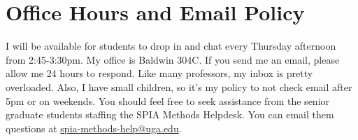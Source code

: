 \documentclass[11pt, letterpaper]{article}
\begin{document}
\section*{Office Hours and Email Policy}
I will be available for students to drop in and chat every Thursday afternoon from 2:45-3:30pm. My office is Baldwin 304C. If you send me an email, please allow me 24 hours to respond. Like many professors, my inbox is pretty overloaded. Also, I have small children, so it's my policy to not check email after 5pm or on weekends. You should feel free to seek assistance from the senior graduate students staffing the SPIA Methods Helpdesk. You can email them questions at \href{mailto:spia-methods-help@uga.edu}{spia-methods-help@uga.edu}.








\end{document}
